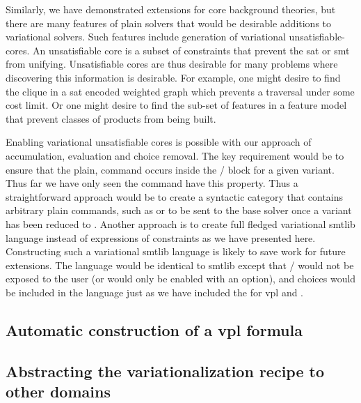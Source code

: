 Similarly, we have demonstrated extensions for core background theories, but
there are many features of plain solvers that would be desirable additions to
variational solvers. Such features include generation of variational
unsatisfiable-cores. An unsatisfiable core is a subset of constraints that
prevent the \ac{sat} or \ac{smt} from unifying. Unsatisfiable cores are thus
desirable for many problems where discovering this information is desirable. For
example, one might desire to find the clique in a \ac{sat} encoded weighted
graph which prevents a traversal under some cost limit. Or one might desire to
find the sub-set of features in a feature model that prevent classes of products
from being built.

Enabling variational unsatisfiable cores is possible with our approach of
accumulation, evaluation and choice removal. The key requirement would be to
ensure that the plain,  command occurs inside the
/ block for a given variant. Thus far we have only seen the
 command have this property. Thus a straightforward approach would
be to create a syntactic category that contains arbitrary plain commands, such
as  or  to be sent to the base solver once a
variant has been reduced to \unit{}. Another approach is to create full fledged
variational \acl{smtlib} language instead of expressions of constraints as we
have presented here. Constructing such a variational \acl{smtlib} language is
likely to save work for future extensions. The language would be identical to
\acl{smtlib} except that / would not be exposed to the user (or
would only be enabled with an option), and choices would be included in the
language just as we have included the for \ac{vpl} and \evpl{}.


\subsection{Automatic construction of a \ac{vpl} formula}

\subsection{Abstracting the variationalization recipe to other domains}


